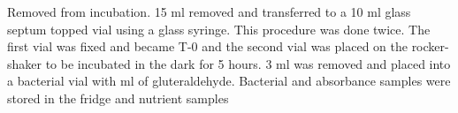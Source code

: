 Removed from incubation. 15 ml removed and transferred to a 10 ml glass septum topped vial using a glass syringe. This procedure was done twice. The first vial was fixed and became T-0 and the second vial was placed on the rocker-shaker to be incubated in the dark for 5 hours. 3 ml was removed and placed into a bacterial vial with  ml of gluteraldehyde. Bacterial and absorbance samples were stored in the fridge and nutrient samples  